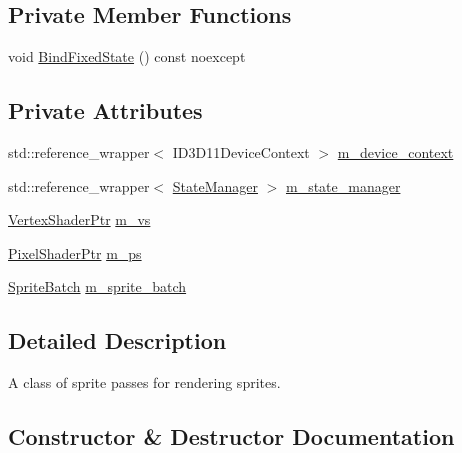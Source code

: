 \subsection*{Private Member Functions}
\begin{DoxyCompactItemize}
\item 
void \hyperlink{classmage_1_1rendering_1_1_sprite_pass_a76d7ea36f7e24283411dc90686238136}{Bind\+Fixed\+State} () const noexcept
\end{DoxyCompactItemize}
\subsection*{Private Attributes}
\begin{DoxyCompactItemize}
\item 
std\+::reference\+\_\+wrapper$<$ I\+D3\+D11\+Device\+Context $>$ \hyperlink{classmage_1_1rendering_1_1_sprite_pass_a9e8435cadd9b3484d9845690204c5706}{m\+\_\+device\+\_\+context}
\item 
std\+::reference\+\_\+wrapper$<$ \hyperlink{classmage_1_1rendering_1_1_state_manager}{State\+Manager} $>$ \hyperlink{classmage_1_1rendering_1_1_sprite_pass_a60241eeab6141da050b1c61979894539}{m\+\_\+state\+\_\+manager}
\item 
\hyperlink{namespacemage_1_1rendering_aaf704b9c54a4181f4950a1761de69dda}{Vertex\+Shader\+Ptr} \hyperlink{classmage_1_1rendering_1_1_sprite_pass_a05c13379108ffa463958e8addabdcccf}{m\+\_\+vs}
\item 
\hyperlink{namespacemage_1_1rendering_af03d922b228ee9c8542baaa2ecc9f259}{Pixel\+Shader\+Ptr} \hyperlink{classmage_1_1rendering_1_1_sprite_pass_aac258f752dde77f0e428b8d8725b8e66}{m\+\_\+ps}
\item 
\hyperlink{classmage_1_1rendering_1_1_sprite_batch}{Sprite\+Batch} \hyperlink{classmage_1_1rendering_1_1_sprite_pass_a458633552d664181db78adb6c52a5f22}{m\+\_\+sprite\+\_\+batch}
\end{DoxyCompactItemize}


\subsection{Detailed Description}
A class of sprite passes for rendering sprites. 

\subsection{Constructor \& Destructor Documentation}
\hypertarget{classmage_1_1rendering_1_1_sprite_pass_ae247bfa4b2b13a874e080d53e271e974}{}\label{classmage_1_1rendering_1_1_sprite_pass_ae247bfa4b2b13a874e080d53e271e974} 
